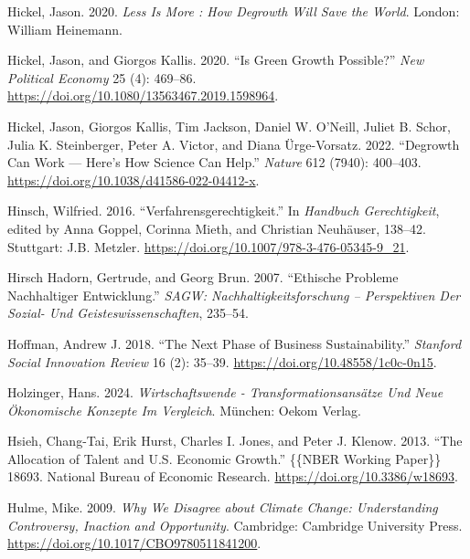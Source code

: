 \documentclass[
  a4paper,
  openany]{book}
\newlength{\cslhangindent}
\newenvironment{CSLReferences}[2] %
 {\begin{list}{}{%
  \setlength{\itemindent}{0pt}
  \setlength{\leftmargin}{0pt}
  \setlength{\parsep}{0pt}
  \ifodd #1
   \setlength{\leftmargin}{\cslhangindent}
   \setlength{\itemindent}{-1\cslhangindent}
  \fi
  \setlength{\itemsep}{#2\baselineskip}}}
 {\end{list}}
\begin{document}
\begin{CSLReferences}{1}{0}
Hickel, Jason. 2020. \emph{Less Is More : How Degrowth Will Save the
World}. London: William Heinemann.

Hickel, Jason, and Giorgos Kallis. 2020. {``Is {Green Growth
Possible}?''} \emph{New Political Economy} 25 (4): 469--86.
\url{https://doi.org/10.1080/13563467.2019.1598964}.

Hickel, Jason, Giorgos Kallis, Tim Jackson, Daniel W. O'Neill, Juliet B.
Schor, Julia K. Steinberger, Peter A. Victor, and Diana Ürge-Vorsatz.
2022. {``Degrowth Can Work --- Here's How Science Can Help.''}
\emph{Nature} 612 (7940): 400--403.
\url{https://doi.org/10.1038/d41586-022-04412-x}.

Hinsch, Wilfried. 2016. {``{Verfahrensgerechtigkeit}.''} In
\emph{{Handbuch Gerechtigkeit}}, edited by Anna Goppel, Corinna Mieth,
and Christian Neuhäuser, 138--42. Stuttgart: J.B. Metzler.
\url{https://doi.org/10.1007/978-3-476-05345-9_21}.

Hirsch Hadorn, Gertrude, and Georg Brun. 2007. {``Ethische {Probleme}
Nachhaltiger {Entwicklung}.''} \emph{SAGW: Nachhaltigkeitsforschung --
Perspektiven Der Sozial- Und Geisteswissenschaften}, 235--54.

Hoffman, Andrew J. 2018. {``The {Next Phase} of {Business
Sustainability}.''} \emph{Stanford Social Innovation Review} 16 (2):
35--39. \url{https://doi.org/10.48558/1c0c-0n15}.

Holzinger, Hans. 2024. \emph{Wirtschaftswende -
{Transformationsans{ä}tze} Und Neue {Ö}konomische {Konzepte} Im
{Vergleich}}. M{ü}nchen: Oekom Verlag.

Hsieh, Chang-Tai, Erik Hurst, Charles I. Jones, and Peter J. Klenow.
2013. {``The {Allocation} of {Talent} and {U}.{S}. {Economic Growth}.''}
\{\{NBER Working Paper\}\} 18693. National Bureau of Economic Research.
\url{https://doi.org/10.3386/w18693}.

Hulme, Mike. 2009. \emph{Why {We Disagree} about {Climate Change}:
{Understanding Controversy}, {Inaction} and {Opportunity}}. Cambridge:
Cambridge University Press.
\url{https://doi.org/10.1017/CBO9780511841200}.


\end{CSLReferences}
\end{document}
